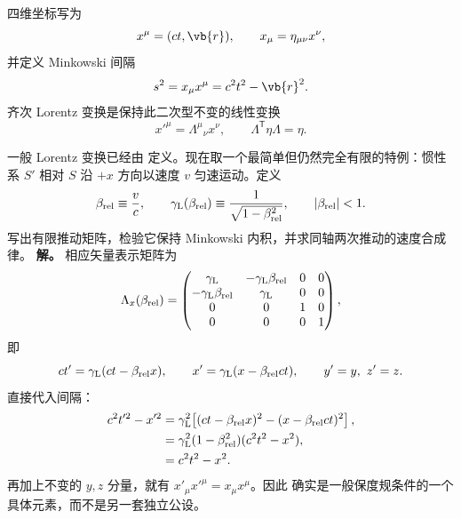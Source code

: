 四维坐标写为
\begin{equation*}
 x^\mu=(ct,\vb{r}),\qquad x_\mu=\eta_{\mu\nu}x^\nu,
\end{equation*}
并定义 Minkowski 间隔
\begin{equation*}
 s^2=x_\mu x^\mu=c^2t^2-\vb{r}^2.
\end{equation*}
齐次 Lorentz 变换是保持此二次型不变的线性变换
\begin{equation}
 x'^\mu=\Lambda^\mu{}_{\nu}x^\nu,
 \qquad
 \Lambda^{\mathsf T}\eta\Lambda=\eta.
 \label{eq:lorentz-metric}
\end{equation}
\begin{exbox}[沿 $x$ 轴的有限推动]
一般 Lorentz 变换已经由 定义。现在取一个最简单但仍然完全有限的特例：惯性系 $S'$ 相对 $S$ 沿 $+x$ 方向以速度 $v$ 匀速运动。定义
\begin{equation*}
 \beta_{\rm rel}\equiv\frac{v}{c},
 \qquad
 \gamma_{\rm L}(\beta_{\rm rel})\equiv\frac1{\sqrt{1-\beta_{\rm rel}^2}},
 \qquad |\beta_{\rm rel}|<1.
\end{equation*}
写出有限推动矩阵，检验它保持 Minkowski 内积，并求同轴两次推动的速度合成律。
\textbf{解。} 相应矢量表示矩阵为
\begin{equation}
 \Lambda_x(\beta_{\rm rel})=
 \begin{pmatrix}
 \gamma_{\rm L} &-\gamma_{\rm L}\beta_{\rm rel}&0&0\\
 -\gamma_{\rm L}\beta_{\rm rel}&\gamma_{\rm L}&0&0\\
 0&0&1&0\\
 0&0&0&1
 \end{pmatrix},
 \label{eq:x-boost-matrix-dp61}
\end{equation}
即
\begin{equation*}
 ct'=\gamma_{\rm L}(ct-\beta_{\rm rel}x),
 \qquad
 x'=\gamma_{\rm L}(x-\beta_{\rm rel}ct),
 \qquad y'=y,\ z'=z.
\end{equation*}
直接代入间隔：
\begin{align*}
 c^2t'^2-x'^2
 &=\gamma_{\rm L}^2\!
 \left[(ct-\beta_{\rm rel}x)^2
 -(x-\beta_{\rm rel}ct)^2\right],\\
 &=\gamma_{\rm L}^2(1-\beta_{\rm rel}^2)(c^2t^2-x^2),\\
 &=c^2t^2-x^2.
\end{align*}
再加上不变的 $y,z$ 分量，就有 $x'_\mu x'^\mu=x_\mu x^\mu$。因此 确实是一般保度规条件的一个具体元素，而不是另一套独立公设。


\end{exbox}
